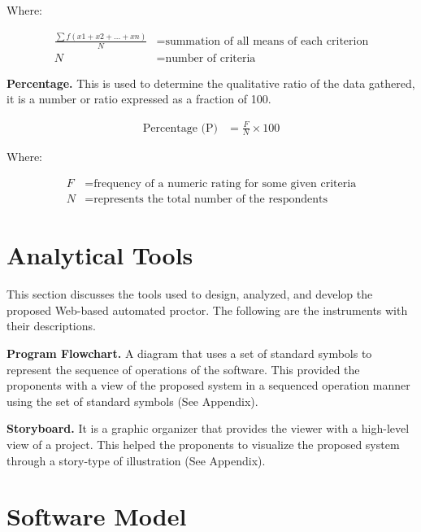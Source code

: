 Where:

\begin{equation*}
   \begin{split}
      \frac{\sum f(x1 + x2 + ... + xn)}{N} & = \text{summation of all means of each criterion} \\
      N & = \text{number of criteria}
   \end{split}
\end{equation*}

\textbf{Percentage.}
This is used to determine the qualitative ratio of the data gathered, it is a number or ratio expressed as a fraction of 100.

\begin{equation*}
   \begin{split}
      \text{Percentage (P)} & = \frac{F}{N} \times 100
   \end{split}
\end{equation*}

Where:

\begin{equation*}
   \begin{split}
      F & = \text{frequency of a numeric rating for some given criteria} \\
      N & = \text{represents the total number of the respondents}
   \end{split}
\end{equation*}

\section{Analytical Tools}

This section discusses the tools used to design, analyzed, and develop the proposed Web-based automated proctor.
The following are the instruments with their descriptions.

\textbf{Program Flowchart.}
A diagram that uses a set of standard symbols to represent the sequence of operations of the software.
This provided the proponents with a view of the proposed system in a sequenced operation manner using the set of standard symbols (See Appendix).

\textbf{Storyboard.}
It is a graphic organizer that provides the viewer with a high-level view of a project.
This helped the proponents to visualize the proposed system through a story-type of illustration (See Appendix).

\section{Software Model}

